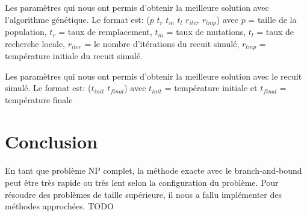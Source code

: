 \documentclass[12pt,letterpaper,twoside]{article}
\begin{document}
			\begin{table}[H]
				\centering
				\footnotesize
				
				\caption{Les paramètres qui nous ont permis d'obtenir la meilleure solution avec l'algorithme génétique.
					Le format est: (\(p\) \(t_r\) \(t_m\) \(t_l\) \(r_{iter}\) \(r_{tmp}\)) avec \(p\) = taille de la population,
					\(t_r\) = taux de remplacement, \(t_m\) = taux de mutations, \(t_l\) = taux de recherche locale, \(r_{iter}\) =
					le nombre d'itérations du recuit simulé, \(r_{tmp}\) = température initiale du recuit simulé.}
				\label{table:genetic-parameters}
			\end{table}

			\begin{table}[H]
				\centering
				
				\caption{Les paramètres qui nous ont permis d'obtenir la meilleure solution avec le recuit simulé.
					Le format est: (\(t_{init}\) \(t_{final}\)) avec \(t_{init}\) = température initiale et
					\(t_{final}\) = température finale}
				\label{table:annealing-parameters}
			\end{table}
	\section{Conclusion}
		\paragraph*{}
			En tant que problème NP complet, la méthode exacte avec le branch-and-bound peut être très rapide ou très lent selon la configuration du problème.
			Pour résoudre des problèmes de taille supérieure, il nous a fallu implémenter des méthodes approchées.
			TODO
	\newpage\printbibliography[heading=bibintoc]{}
\end{document}
